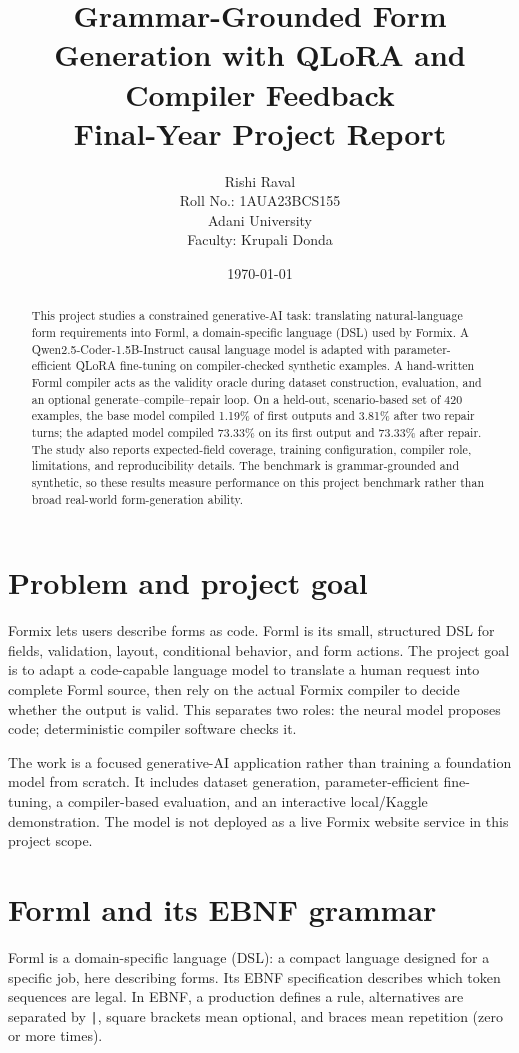\documentclass[11pt,a4paper]{article}
\title{Grammar-Grounded Form Generation with QLoRA and Compiler Feedback\\[0.5em]
\large Final-Year Project Report}
\author{Rishi Raval\\Roll No.: 1AUA23BCS155\\Adani University\\Faculty: Krupali Donda}
\date{\today}
\begin{document}
\maketitle

\begin{abstract}
This project studies a constrained generative-AI task: translating natural-language form requirements into Forml, a domain-specific language (DSL) used by Formix. A Qwen2.5-Coder-1.5B-Instruct causal language model is adapted with parameter-efficient QLoRA fine-tuning on compiler-checked synthetic examples. A hand-written Forml compiler acts as the validity oracle during dataset construction, evaluation, and an optional generate--compile--repair loop. On a held-out, scenario-based set of 420 examples, the base model compiled 1.19\% of first outputs and 3.81\% after two repair turns; the adapted model compiled 73.33\% on its first output and 73.33\% after repair. The study also reports expected-field coverage, training configuration, compiler role, limitations, and reproducibility details. The benchmark is grammar-grounded and synthetic, so these results measure performance on this project benchmark rather than broad real-world form-generation ability.
\end{abstract}

\section{Problem and project goal}
Formix lets users describe forms as code. Forml is its small, structured DSL for fields, validation, layout, conditional behavior, and form actions. The project goal is to adapt a code-capable language model to translate a human request into complete Forml source, then rely on the actual Formix compiler to decide whether the output is valid. This separates two roles: the neural model proposes code; deterministic compiler software checks it.

The work is a focused generative-AI application rather than training a foundation model from scratch. It includes dataset generation, parameter-efficient fine-tuning, a compiler-based evaluation, and an interactive local/Kaggle demonstration. The model is not deployed as a live Formix website service in this project scope.

\section{Forml and its EBNF grammar}
Forml is a domain-specific language (DSL): a compact language designed for a specific job, here describing forms. Its EBNF specification describes which token sequences are legal. In EBNF, a production defines a rule, alternatives are separated by \texttt{|}, square brackets mean optional, and braces mean repetition (zero or more times).
\end{document}
